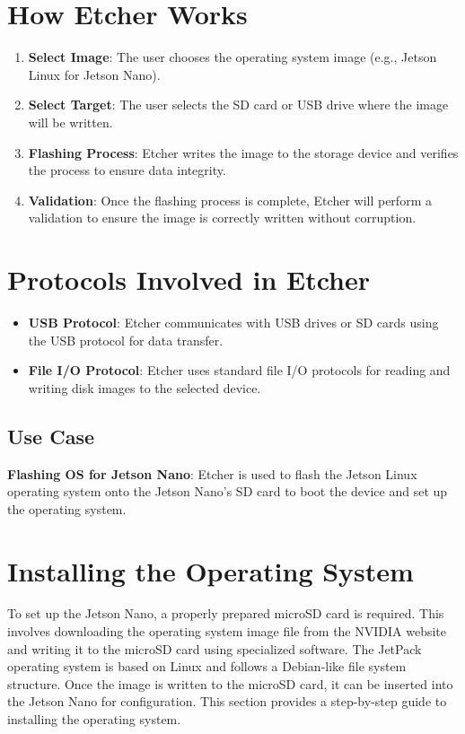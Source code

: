 \section{How Etcher Works}

\begin{enumerate}
	\item \textbf{Select Image}: The user chooses the operating system image (e.g., Jetson Linux for Jetson Nano).
	\item \textbf{Select Target}: The user selects the SD card or USB drive where the image will be written.
	\item \textbf{Flashing Process}: Etcher writes the image to the storage device and verifies the process to ensure data integrity.
	\item \textbf{Validation}: Once the flashing process is complete, Etcher will perform a validation to ensure the image is correctly written without corruption.
\end{enumerate}

\section{Protocols Involved in Etcher}

\begin{itemize}
	\item \textbf{USB Protocol}: Etcher communicates with USB drives or SD cards using the USB protocol for data transfer.
	\item \textbf{File I/O Protocol}: Etcher uses standard file I/O protocols for reading and writing disk images to the selected device.
\end{itemize}

\subsection{Use Case}

\textbf{Flashing OS for Jetson Nano}: Etcher is used to flash the Jetson Linux operating system onto the Jetson Nano’s SD card to boot the device and set up the operating system. \cite{Balena:2025}



\section{Installing the Operating System}

To set up the Jetson Nano, a properly prepared microSD card is required. This involves downloading the operating system image file from the NVIDIA website and writing it to the microSD card using specialized software. The JetPack operating system is based on Linux and follows a Debian-like file system structure. Once the image is written to the microSD card, it can be inserted into the Jetson Nano for configuration. This section provides a step-by-step guide to installing the operating system.

